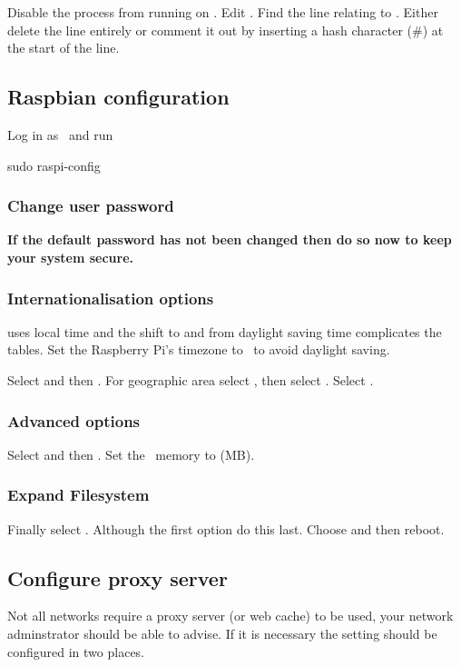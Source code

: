 Disable the  process from running on
. Edit . Find the line
relating to . Either delete the line entirely or
comment it out by inserting a hash character (\#) at the start of the
line.

\subsection{Raspbian configuration}

Log in as \piUser\ and run
\begin{Cmd}
sudo raspi-config
\end{Cmd}

\subsubsection{Change user password}
\textbf{If the default password has not been changed then do so now to keep
your system secure.}

\subsubsection{Internationalisation options}
 uses local time and the shift to and from daylight
saving time complicates the  tables. Set the Raspberry
Pi's timezone to \utc\ to avoid daylight saving.

Select  and
then . For geographic area select %
, then select \code{\utc}. Select .

\subsubsection{Advanced options}
Select  and then . Set the \gpu\ memory to  (MB).

\subsubsection{Expand Filesystem}
Finally select . Although the first option
do this last. Choose  and then reboot.


\subsection{Configure proxy server}
Not all networks require a proxy server (or web cache) to be used,
your network adminstrator should be able to advise. If it is necessary
the setting should be configured in two places.


